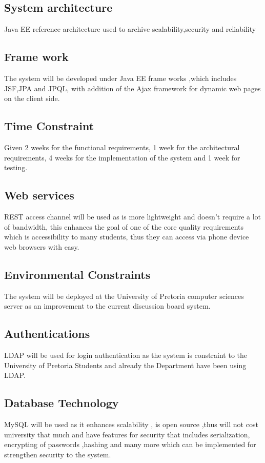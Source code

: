 \begin{flushleft}
			
\subsection*{System architecture} 
Java EE reference architecture used to archive scalability,security and reliability 

\subsection*{Frame work}
The system will be developed under Java EE frame works ,which includes JSF,JPA and JPQL, with addition of the Ajax framework for dynamic web pages on the client side.

\subsection*{Time Constraint} 
Given 2 weeks for the functional requirements, 1 week for the architectural requirements, 4 weeks for the implementation of the system and 1 week for testing.

\subsection*{Web services}
REST access channel will be used as is more lightweight and doesn't require a lot of bandwidth, this enhances the goal of one of the core quality requirements which is accessibility to many students, thus they can access via phone device web browsers with easy.

\subsection*{Environmental Constraints}
The system will be deployed at the University of Pretoria computer sciences server as an improvement to the current discussion board system.

\subsection*{Authentications}
LDAP will be used for login authentication as the system is constraint to the University of Pretoria Students and already the Department have been using LDAP.

\subsection*{Database Technology}
MySQL will be used as it enhances scalability , is open source ,thus will not cost university that much and have features for security that includes serialization, encrypting of passwords ,hashing and many more which can be implemented for strengthen security to the system.
		
\end{flushleft}
